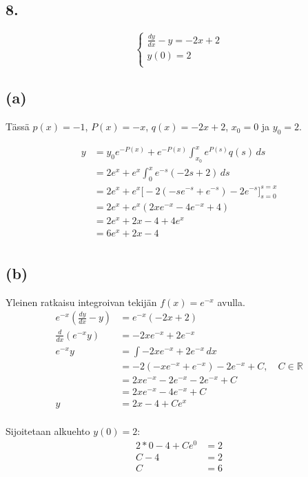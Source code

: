 \documentclass{article}
\begin{document}
\subsection*{8.}

\[
  \begin{cases}
    \frac{dy}{dx} - y = -2x + 2 \\
    y(0) = 2 \\
  \end{cases}
\]

\subsection*{(a)}

Tässä $p(x) = -1$, $P(x) = -x$, $q(x) = -2x + 2$, $x_0 = 0$ ja $y_0 = 2$.

\begin{align*}
  y &= y_0e^{-P(x)} + e^{-P(x)} \int_{x_0}^{x} e^{P(s)}q(s)\,ds \\
    &= 2e^x + e^x \int_0^x e^{-s}(-2s + 2)\,ds \\
    &= 2e^x + e^x \Big[-2(-se^{-s} + e^{-s}) - 2e^{-s}\Big]_{s=0}^{s=x} \\
    &= 2e^x + e^x (2xe^{-x} - 4e^{-x} + 4) \\
    &= 2e^x + 2x - 4 + 4e^x \\
    &= 6e^x + 2x - 4 \\
\end{align*}

\subsection*{(b)}

Yleinen ratkaisu integroivan tekijän $f(x) = e^{-x}$ avulla.
\begin{align*}
  e^{-x}(\frac{dy}{dx} - y) &= e^{-x}(-2x + 2) \\
  \frac{d}{dx}(e^{-x}y) &= -2xe^{-x} + 2e^{-x} \\
  e^{-x}y &= \int -2xe^{-x} + 2e^{-x}\,dx \\
          &= -2(-xe^{-x} + e^{-x}) -2e^{-x} + C, \quad C \in \mathbb{R} \\
          &= 2xe^{-x} - 2e^{-x} - 2e^{-x} + C \\
          &= 2xe^{-x} - 4e^{-x} + C \\
  y &= 2x - 4 + Ce^x \\
\end{align*}

Sijoitetaan alkuehto $y(0) = 2$:
\begin{align*}
  2*0 - 4 + Ce^0 &= 2 \\
  C - 4 &= 2 \\
  C &= 6 \\
\end{align*}
\end{document}
